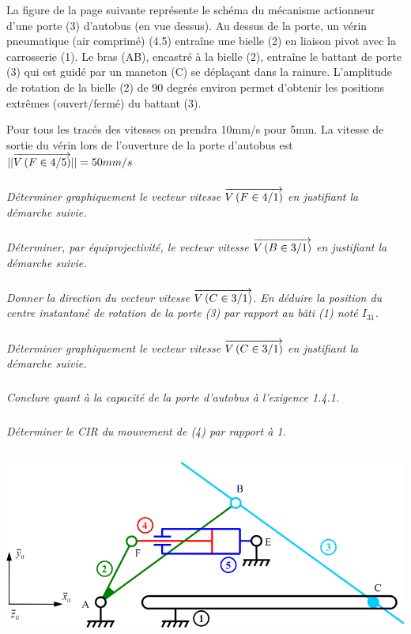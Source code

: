 \documentclass[10pt,fleqn]{article} %
\begin{document}
La figure de la page suivante représente le schéma du mécanisme actionneur d'une porte (3) d'autobus (en vue dessus). Au dessus de la porte, un vérin pneumatique (air comprimé) (4,5) entraîne une bielle (2) en liaison pivot avec la carrosserie (1). Le bras (AB), encastré à la bielle (2), entraîne le battant de porte (3) qui est guidé par un maneton (C) se déplaçant dans la rainure. L'amplitude de rotation de la bielle (2) de 90 degrés environ permet d'obtenir les positions extrêmes (ouvert/fermé) du battant (3). 

Pour tous les tracés des vitesses on prendra 10mm/s pour 5mm.
 La vitesse de sortie du vérin lors de l'ouverture de la porte d'autobus est $||\overrightarrow{V\left( {F} \in {4}/{5}\right)}||=50mm/s$


\subparagraph{}
\textit{Déterminer graphiquement le vecteur vitesse $\overrightarrow{V\left( {F} \in {4}/{1}\right)}$ en justifiant la démarche suivie. }

\subparagraph{}
\textit{Déterminer, par équiprojectivité, le vecteur vitesse $\overrightarrow{V\left( {B} \in {3}/{1}\right)}$ en justifiant la démarche suivie.}

\subparagraph{}
\textit{Donner la direction du vecteur vitesse $\overrightarrow{V\left( {C} \in {3}/{1}\right)}$. En déduire la position du centre instantané de rotation de la porte (3) par rapport au bâti (1) noté $I_{31}$.}

\subparagraph{}
\textit{Déterminer graphiquement le vecteur vitesse $\overrightarrow{V\left( {C} \in {3}/{1}\right)}$ en justifiant la démarche suivie.}

\subparagraph{}
\textit{Conclure quant à la capacité de  la porte d'autobus à l'exigence 1.4.1.}

\subparagraph{}
\textit{Déterminer le CIR du mouvement de (4) par rapport à 1.}

\newpage

$$\quad$$

\vspace{15cm}

\begin{center}
\includegraphics[width=.8\textwidth]{images/fig7}
\end{center}
\end{document}
